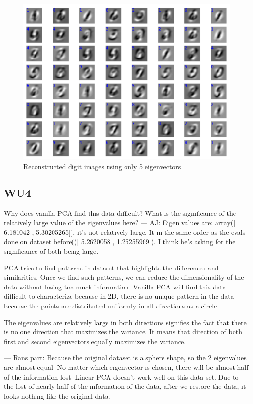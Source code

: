 \documentclass[a4paper,11pt]{article}
\begin{document}
\begin{figure}[!ht]
  \begin{center}
  \includegraphics[width=4.5in]{WU3_c.pdf}
  \caption{Reconstructed digit images using only 5 eigenvectors}
  \label{figures:WU3c}
  \end{center}
\end{figure}

\subsection{WU4}
\textsf{Why does vanilla PCA find this data difficult? What is the
significance of the relatively large value of the eigenvalues
here?}\vspace{0.1in}
---
AJ: Eigen values are: array([ 6.181042  ,  5.30205265]), it's not
relatively large.  It in the same order as the evals done on dataset
before(([ 5.2620058 ,  1.25255969]). I think he's asking for
the significance of both being large.
----

PCA tries to find patterns in dataset that highlights the differences
and similarities. Once we find such patterns, we can reduce the
dimensionality of the data without losing too much
information. Vanilla PCA will find this data difficult to characterize
because in 2D, there is no unique pattern in the data because the points are distributed uniformly in
all directions as a circle.

The eigenvalues are relatively large in both directions signifies the
fact that there is no one direction that maximizes the variance. It
means that direction of both first and second eigenvectors equally
maximizes the variance. 

---
Rans part:
Because the original dataset is a sphere shape, so the 2 eigenvalues are
almost equal.  No matter which eigenvector is chosen, there will be almost
half of the information lost. Linear PCA doesn't work well on this data set.
Due to the lost of nearly half of the information of the data, after we
restore the data, it looks nothing like the original data.
\end{document}
